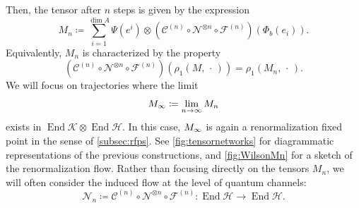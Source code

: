 \documentclass[a4paper,10pt]{amsart}
\newcommand{\Fine}{\mathcal{F}}
\newcommand{\Coarse}{\mathcal{C}}
\newcommand{\Noisy}{\mathcal{N}}
\newcommand{\placeholder}{\,\cdot\,}
\theoremstyle{definition}
\begin{document}
Then, the tensor after $n$ steps is given by the expression
\begin{equation}
\label{eq:defMn}
    M_{n} \coloneqq
    \sum_{i=1}^{\dim A}
        \Psi(e^i) \otimes (\Coarse^{(n)}\circ \Noisy^{\otimes n}\circ \Fine^{(n)})(\Phi_b(e_i)).
\end{equation}
Equivalently, $M_n$ is characterized by the property
\begin{equation}
\label{eq:charMn}
    (\Coarse^{(n)}\circ \Noisy^{\otimes n} \circ \Fine^{(n)})(\rho_1(M,\placeholder))
    =
    \rho_{1}(M_{n},\placeholder).
\end{equation}
We will focus on trajectories where the limit
\begin{equation}
\label{eq:defMinfty}
M_{\smash{\infty}}
    \coloneqq
        \lim_{n\to \infty} M_{\smash{n}}
\end{equation}
exists in $\operatorname{End}\mathscr{K}\otimes\operatorname{End}\mathscr{H}$.
In this case, $M_{\smash{\infty}}$ is again a renormalization fixed point in the sense of \cref{subsec:rfps}.
See \cref{fig:tensornetworks} for diagrammatic representations of the previous constructions, and \cref{fig:WilsonMn} for a sketch of the renormalization flow.
Rather than focusing directly on the tensors $M_n$, we will often consider the induced flow at the level of quantum channels:
\begin{equation}
    \Noisy_n \coloneqq \Coarse^{(n)} \circ \Noisy^{\otimes n} \circ \Fine^{(n)} :
    \operatorname{End}\mathscr{H}\to\operatorname{End}\mathscr{H}.
\end{equation}
\end{document}
